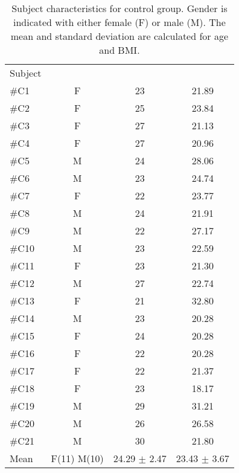 \begin{longtable}{l|c|c|c}
		\caption{Subject characteristics for control group. Gender is indicated with either female (F) or male (M). The mean and standard deviation are calculated for age and BMI.}
	\label{tab:subjectsB} \\
\cellcolor[HTML]{C0C0C0} {Subject} & 
\cellcolor[HTML]{C0C0C0}{Gender} & \cellcolor[HTML]{C0C0C0}{Age}  & \cellcolor[HTML]{C0C0C0}{BMI}  	\\  \rule{0pt}{3ex} 
\#C1 &  F & 23 & 21.89 \\ \hline \hline \rule{0pt}{3ex} 
\#C2 & F & 25 & 23.84 \\ \hline \hline \rule{0pt}{3ex} 
\#C3 & F & 27 & 21.13 \\ \hline \hline \rule{0pt}{3ex} 
\#C4 & F & 27 & 20.96\\ \hline \hline \rule{0pt}{3ex} 
\#C5 & M & 24 & 28.06 \\ \hline \hline \rule{0pt}{3ex} 
\#C6 & M & 23 &  24.74 \\ \hline \hline \rule{0pt}{3ex} 
\#C7 & F & 22 & 23.77 \\ \hline \hline \rule{0pt}{3ex} 
	\#C8 & M & 24 & 21.91 \\ \hline \hline \rule{0pt}{3ex} 
	\#C9 & M & 22 & 27.17  \\ \hline \hline \rule{0pt}{3ex} 
	\#C10 & M & 23 &  22.59 \\ \hline \hline \rule{0pt}{3ex} 
\#C11 & F & 23  & 21.30 \\ \hline \hline \rule{0pt}{3ex} 
\#C12 & M & 27 & 22.74 \\ \hline \hline \rule{0pt}{3ex} 
\#C13 & F  & 21 & 32.80  \\ \hline \hline \rule{0pt}{3ex} 
\#C14 & M &  23 & 20.28 \\ \hline \hline \rule{0pt}{3ex} 
\#C15 & F & 24 &  20.28 \\ \hline \hline \rule{0pt}{3ex} 
	\#C16 & F & 22  & 20.28 \\ \hline \hline \rule{0pt}{3ex} 
	\#C17 & F  & 22 &  21.37\\ \hline \hline \rule{0pt}{3ex} 
	\#C18 & F & 23  & 18.17   \\ \hline \hline \rule{0pt}{3ex}
		\#C19 &  M & 29 & 31.21 \\ \hline \hline \rule{0pt}{3ex} 
	\#C20 & M & 26 & 26.58  \\ \hline \hline \rule{0pt}{3ex}  	
	\#C21 & M & 30 & 21.80  \\ \hline \hline \rule{0pt}{3ex}  
Mean & F(11) M(10) & 24.29 $\pm$ 2.47 & 23.43 $\pm$ 3.67
	\\ \hline 	
\end{longtable}
\vspace{-.5cm}
